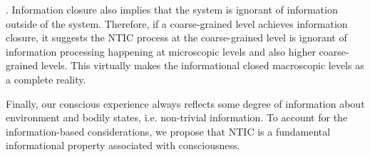         
        . 
        Information closure also implies that the system is ignorant of information outside of the system. Therefore, if a coarse-grained level achieves information closure, it suggests the NTIC process at the coarse-grained level is ignorant of information processing happening at microscopic levels and also higher coarse-grained levels. This virtually makes the informational closed macroscopic levels as a complete reality. 
        
        Finally, our conscious experience always reflects some degree of information about environment and bodily states, i.e. non-trivial information. To account for the information-based considerations, we propose that NTIC is a fundamental informational property associated with consciousness. 
        
        
        

